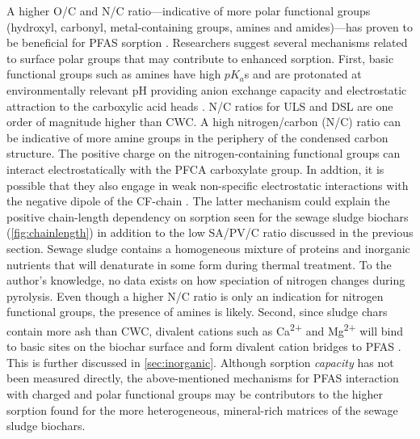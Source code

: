 A higher O/C and N/C ratio---indicative of more polar functional groups (hydroxyl, carbonyl, metal-containing groups, amines and amides)---has proven to be beneficial for PFAS sorption \citep{du2014adsorption}. Researchers suggest several mechanisms related to surface polar groups that may contribute to enhanced sorption. First, basic functional groups such as amines have high $pK_a$s and are protonated at environmentally relevant pH providing anion exchange capacity and electrostatic attraction to the carboxylic acid heads \citep{deng2010removal}. N/C ratios for ULS and DSL are one order of magnitude higher than CWC. A high nitrogen/carbon (N/C) ratio can be indicative of more amine groups in the periphery of the condensed carbon structure. The positive charge on the nitrogen-containing functional groups can interact electrostatically with the PFCA carboxylate group. In addtion, it is possible that they also engage in weak non-specific electrostatic interactions with the negative dipole of the CF-chain \citep{xiao2011effects}. The latter mechanism could explain the positive chain-length dependency on sorption seen for the sewage sludge biochars (\cref{fig:chainlength}) in addition to the low SA/PV/C ratio discussed in the previous section. Sewage sludge contains a homogeneous mixture of proteins and inorganic nutrients that will denaturate in some form during thermal treatment. To the author's knowledge, no data exists on how speciation of nitrogen changes during pyrolysis. Even though a higher N/C ratio is only an indication for nitrogen functional groups, the presence of amines is likely. Second, since sludge chars contain more ash than CWC, divalent cations such as Ca\textsuperscript{2+} and Mg\textsuperscript{2+} will bind to basic sites on the biochar surface and form divalent cation bridges to PFAS \citep{higgins2006sorption}. This is further discussed in \cref{sec:inorganic}. Although sorption \textit{capacity} has not been measured directly, the above-mentioned mechanisms for PFAS interaction with charged and polar functional groups may be contributors to the higher sorption found for the more heterogeneous, mineral-rich matrices of the sewage sludge biochars. 

